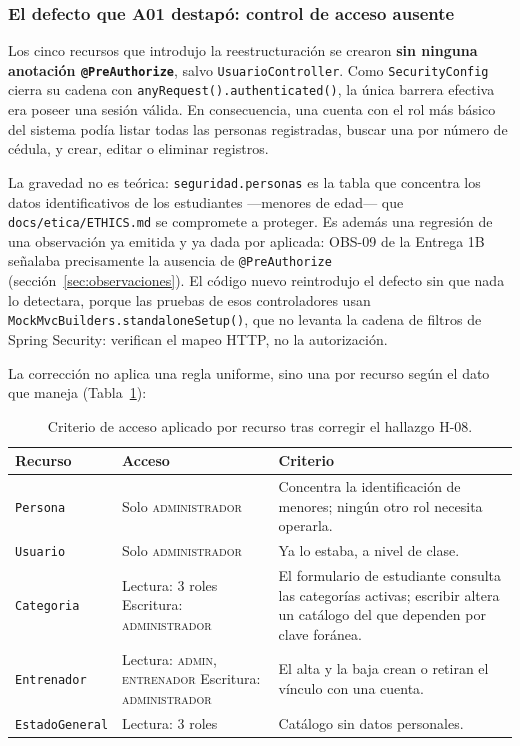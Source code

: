 \documentclass[11pt,a4paper]{article}
\newcommand{\ruta}[1]{\texttt{\footnotesize #1}}
\begin{document}
\subsubsection{El defecto que A01 destapó: control de acceso ausente}

Los cinco recursos que introdujo la reestructuración se crearon
\textbf{sin ninguna anotación \texttt{@PreAuthorize}}, salvo
\texttt{UsuarioController}. Como \texttt{SecurityConfig} cierra su cadena
con \texttt{anyRequest().authenticated()}, la única barrera efectiva era
poseer una sesión válida. En consecuencia, una cuenta con el rol más
básico del sistema podía listar todas las personas registradas, buscar una
por número de cédula, y crear, editar o eliminar registros.

La gravedad no es teórica: \texttt{seguridad.personas} es la tabla que
concentra los datos identificativos de los estudiantes —menores de edad—
que \ruta{docs/etica/ETHICS.md} se compromete a proteger. Es además una
regresión de una observación ya emitida y ya dada por aplicada: OBS-09 de
la Entrega 1B señalaba precisamente la ausencia de \texttt{@PreAuthorize}
(sección~\ref{sec:observaciones}). El código nuevo reintrodujo el defecto
sin que nada lo detectara, porque las pruebas de esos controladores usan
\texttt{MockMvcBuilders.standaloneSetup()}, que no levanta la cadena de
filtros de Spring Security: verifican el mapeo HTTP, no la autorización.

La corrección no aplica una regla uniforme, sino una por recurso según el
dato que maneja (Tabla~\ref{tab:acceso-por-recurso}):

\begin{table}[htbp]
\centering
\caption{Criterio de acceso aplicado por recurso tras corregir el hallazgo H-08.}
\label{tab:acceso-por-recurso}
\begin{tabular}{@{}llp{6.4cm}@{}}
\toprule
\textbf{Recurso} & \textbf{Acceso} & \textbf{Criterio} \\
\midrule
\texttt{Persona} & Solo \textsc{administrador} & Concentra la identificación de menores; ningún otro rol necesita operarla. \\
\texttt{Usuario} & Solo \textsc{administrador} & Ya lo estaba, a nivel de clase. \\
\texttt{Categoria} & Lectura: 3 roles \newline Escritura: \textsc{administrador} & El formulario de estudiante consulta las categorías activas; escribir altera un catálogo del que dependen por clave foránea. \\
\texttt{Entrenador} & Lectura: \textsc{admin}, \textsc{entrenador} \newline Escritura: \textsc{administrador} & El alta y la baja crean o retiran el vínculo con una cuenta. \\
\texttt{EstadoGeneral} & Lectura: 3 roles & Catálogo sin datos personales. \\
\bottomrule
\end{tabular}
\end{table}
\end{document}
